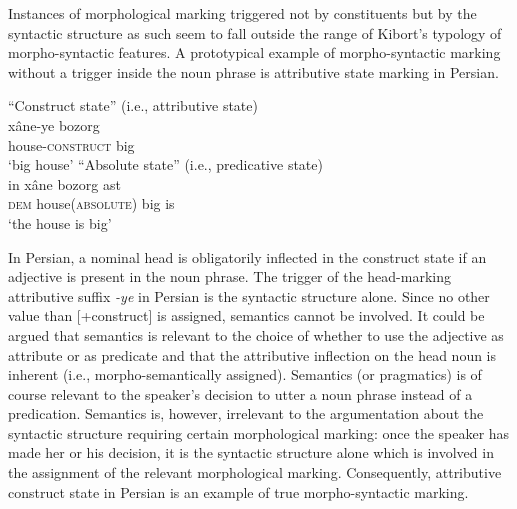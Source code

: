 Instances of morphological marking triggered not by constituents but by the syntactic structure as such seem to fall outside the range of Kibort's typology of morpho-syntactic features. A prototypical example of morpho-syntactic marking without a trigger inside the noun phrase is attributive state marking in Persian.
\begin{exe}
\ex 
{}
\label{persian state}
\begin{xlist}
\ex 
{\rm “Construct state” (i.e., attributive state)}\\
\gll 	xâne-ye bozorg\\
	house-\textsc{construct} big\\
\glt 	‘big house’
\ex 
{\rm “Absolute state” (i.e., predicative state)}\\
\gll	in xâne bozorg ast\\
	\textsc{dem} house(\textsc{absolute}) big is\\
\glt	‘the house is big’
\end{xlist}
\end{exe}

In Persian, a nominal head is obligatorily inflected in the construct state if an adjective is present in the noun phrase. The trigger of the head-marking attributive suffix \textit{-ye} in Persian is the syntactic structure alone. Since no other value than [+construct] is assigned, semantics cannot be involved. It could be argued that semantics is relevant to the choice of whether to use the adjective as attribute or as predicate and that the attributive inflection on the head noun is inherent (i.e., morpho-semantically assigned). Semantics (or pragmatics) is of course relevant to the speaker's decision to utter a noun phrase instead of a predication. Semantics is, however, irrelevant to the argumentation about the syntactic structure requiring certain morphological marking: once the speaker has made her or his decision, it is the syntactic structure alone which is involved in the assignment of the relevant morphological marking. Consequently, attributive construct state in Persian is an example of true morpho-syntactic marking.

